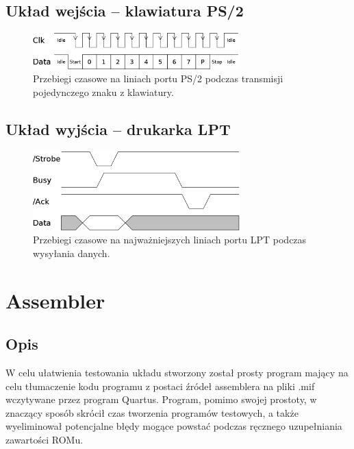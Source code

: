 \documentclass[a4paper,12pt]{report}
\begin{document}
\section{Układ wejścia -- klawiatura PS/2}

\begin{figure}[h]
\centering
\includegraphics[width=8cm]{./pict/PS2.png}
\caption{Przebiegi czasowe na liniach portu PS/2 podczas transmisji pojedynczego znaku z klawiatury.}
\label{fig:ps2}
\end{figure}

\section{Układ wyjścia -- drukarka LPT}

\begin{figure}[h]
\centering
\includegraphics[width=8cm]{./pict/LPT.png}
\caption{Przebiegi czasowe na najważniejszych liniach portu LPT podczas wysyłania danych.}
\label{fig:lpt}
\end{figure}

\chapter{Assembler}

\section{Opis}

W celu ułatwienia testowania układu stworzony został prosty program mający na celu tłumaczenie kodu programu z postaci źródeł assemblera na pliki .mif wczytywane przez program Quartus. Program, pomimo swojej prostoty, w znaczący sposób skrócił czas tworzenia programów testowych, a także wyeliminował potencjalne błędy mogące powstać podczas ręcznego uzupełniania zawartości ROMu.
\end{document}

